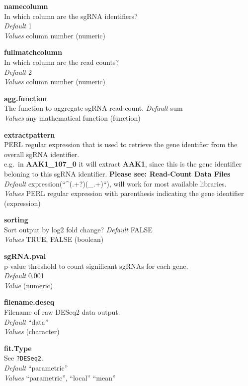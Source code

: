 \documentclass[]{article}
\begin{document}
\textbf{namecolumn}\\
In which column are the sgRNA identifiers?\\
\emph{Default} 1\\
\emph{Values} column number (numeric)

\textbf{fullmatchcolumn}\\
In which column are the read counts?\\
\emph{Default} 2\\
\emph{Values} column number (numeric)

\textbf{agg.function}\\
The function to aggregate sgRNA read-count. \emph{Default} sum\\
\emph{Values} any mathematical function (function)

\textbf{extractpattern}\\
PERL regular expression that is used to retrieve the gene identifier
from the overall sgRNA identifier.\\
e.g.~in \textbf{AAK1\_107\_0} it will extract \textbf{AAK1}, since this
is the gene identifier beloning to this sgRNA identifier. \textbf{Please
see: Read-Count Data Files}\\
\emph{Default} expression(``\^{}(.+?)(\_.+)``), will work for most
available libraries.\\
\emph{Values} PERL regular expression with parenthesis indicating the
gene identifier (expression)

\textbf{sorting}\\
Sort output by log2 fold change? \emph{Default} FALSE\\
\emph{Values} TRUE, FALSE (boolean)

\textbf{sgRNA.pval}\\
p-value threshold to count significant sgRNAs for each gene.\\
\emph{Default} 0.001\\
\emph{Value} (numeric)

\textbf{filename.deseq}\\
Filename of raw DESeq2 data output.\\
\emph{Default} ``data''\\
\emph{Values} (character)

\textbf{fit.Type}\\
See \texttt{?DESeq2}.\\
\emph{Default} ``parametric''\\
\emph{Values} ``parametric'', ``local'' ``mean''
\end{document}
